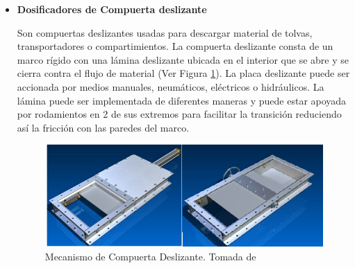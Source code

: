 \begin{itemize}
		\item \textbf{Dosificadores de Compuerta deslizante} %
		
		Son compuertas deslizantes usadas para descargar material de tolvas, transportadores o compartimientos. La
compuerta deslizante consta de un marco rígido con una lámina deslizante ubicada en el interior que se abre y se cierra contra el flujo de material (Ver Figura \ref{deslis}). La placa deslizante puede ser accionada por medios manuales, neumáticos, eléctricos o hidráulicos. La lámina puede ser implementada de diferentes maneras y puede estar apoyada por rodamientos en 2 de sus extremos para facilitar la transición reduciendo así la fricción con las paredes del marco.
	
		\begin{figure}[H]
			\begin{center}
				\includegraphics[scale=0.7]{img/slides.png}
			\end{center}
			\caption{Mecanismo de Compuerta Deslizante. Tomada de \cite{DEM} \label{deslis}}
		\end{figure} %
	\end{itemize}
	

